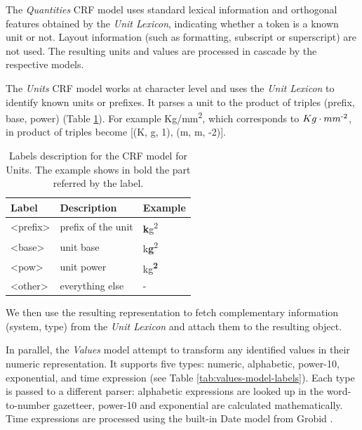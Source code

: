 \documentclass[sigconf]{acmart}
\begin{document}
The \textit{Quantities} CRF model uses standard lexical information and orthogonal features obtained by the \textit{Unit Lexicon}, indicating whether a token is a known unit or not. Layout information (such as formatting, subscript or superscript) are not used. The resulting units and values are processed in cascade by the respective models. 

The \textit{Units} CRF model works at character level and uses the \textit{Unit Lexicon} to identify known units or prefixes. It parses a unit to the product of triples (prefix, base, power) (Table \ref{tab:units-model-labels}). For example Kg/mm\textsuperscript{2}, which corresponds to $Kg\cdot mm\textsuperscript{-2}$, in product of triples become [(K, g, 1), (m, m, -2)]. 

\begin{table}[ht]
  \caption{Labels description for the CRF model for Units. The example shows in bold the part referred by the label. }
  \label{tab:units-model-labels}
  \begin{tabular}{lll}
    \toprule
    Label & Description & Example\\
    \midrule
    <prefix> & prefix of the unit  & \textbf{k}g\textsuperscript{2} \\
    <base> & unit base & k\textbf{g}\textsuperscript{2}\\
    <pow> & unit power & kg\textsuperscript{\textbf{2}}\\
    <other> & everything else & - \\
  \bottomrule
\end{tabular}
\end{table}

We then use the resulting representation to fetch complementary information (system, type) from the \textit{Unit Lexicon} and attach them to the resulting object. 

In parallel, the \textit{Values} model attempt to transform any identified values in their numeric representation. It supports five types: numeric, alphabetic, power-10, exponential, and time expression (see Table \ref{tab:values-model-labels}). Each type is passed to a different parser: alphabetic expressions are looked up in the word-to-number gazetteer, power-10 and exponential are calculated mathematically. Time expressions are processed using the built-in Date model from Grobid \cite{GROBID}.
\end{document}
